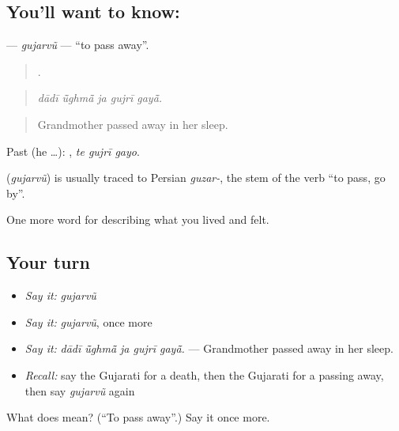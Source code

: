 \subsection*{You'll want to know: }
\textbf{} — \emph{gujarvũ} — \textquotedblleft{}to pass away\textquotedblright{}.

\begin{quote}
    .
\end{quote}

\begin{quote}
\emph{dādī ū̃ghmā̃ ja gujrī gayā̃.}
\end{quote}

\begin{quote}
Grandmother passed away in her sleep.
\end{quote}

Past (he …):   , \emph{te gujrī gayo}.

\begin{cousinweb}
\textbf{} (\emph{gujarvũ}) is usually traced to Persian \emph{guzar-}, the stem of the verb \textquotedblleft{}to pass, go by\textquotedblright{}.
\end{cousinweb}

\begin{grammarlens}[title={What you've built}]
One more word for describing what you lived and felt.
\end{grammarlens}

\subsection*{Your turn}
\begin{itemize}
\raggedright
  \item \emph{Say it:} \emph{gujarvũ}
  \item \emph{Say it:} \emph{gujarvũ}, once more
  \item \emph{Say it:} \emph{dādī ū̃ghmā̃ ja gujrī gayā̃.} — Grandmother passed away in her sleep.
  \item \emph{Recall:} say the Gujarati for a death, then the Gujarati for a passing away, then say \emph{gujarvũ} again
\end{itemize}

\begin{tcolorbox}[breakable,colback=teal!4,colframe=teal!35!black,title={Before you move on}]
What does  mean? (\textquotedblleft{}To pass away\textquotedblright{}.) Say it once more.
\end{tcolorbox}
